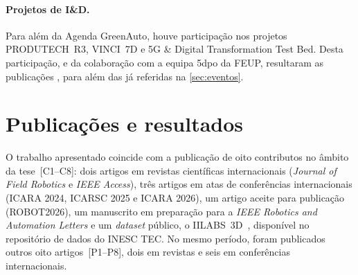 \documentclass[11pt,a4paper,oneside]{article}
\begin{document}
\paragraph{Projetos de I\&D.} Para além da Agenda GreenAuto, houve participação
nos projetos PRODUTECH~R3, VINCI~7D e 5G \& Digital Transformation Test Bed.
Desta participação, e da colaboração com a equipa 5dpo da FEUP, resultaram as
publicações \cite{sousa:icarsc:2021,sousa:jint:2022,sousa:access:2022,
caldana:robot:2024,levin:robot:2024}, para além das já referidas na
\autoref{sec:eventos}.

\section{Publicações e resultados}\label{sec:resultados}

O trabalho apresentado coincide com a publicação de oito contributos no âmbito
da tese~[C1--C8]: dois artigos em revistas científicas internacionais (\textit{Journal
of Field Robotics} e \textit{IEEE Access}), três artigos em atas de conferências
internacionais (ICARA 2024, ICARSC 2025 e ICARA 2026), um artigo aceite para
publicação (ROBOT2026), um manuscrito em preparação para a \textit{IEEE Robotics
and Automation Letters} e um \textit{dataset} público, o
IILABS~3D~\cite{ribeiro:dataset:2025}, disponível no repositório de dados do
INESC TEC. No mesmo período, foram publicados outros oito artigos~[P1--P8],
dois em revistas e seis em conferências internacionais.
\end{document}
